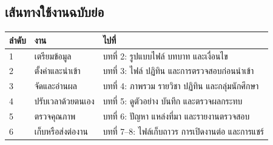 \documentclass[12pt,a4paper]{article}
\begin{document}
\subsection*{เส้นทางใช้งานฉบับย่อ}
\begin{center}
\begin{tabular}{L{1.1cm}L{4.2cm}L{8.6cm}}
\toprule
\textbf{ลำดับ} & \textbf{งาน} & \textbf{ไปที่} \\
 & เตรียมข้อมูล & บทที่ 2: รูปแบบไฟล์ บทบาท และเงื่อนไข \\
2 & ตั้งค่าและนำเข้า & บทที่ 3: ไฟล์ ปฏิทิน และการตรวจสอบก่อนนำเข้า \\
3 & จัดและอ่านผล & บทที่ 4: ภาพรวม รายวิชา ปฏิทิน และกลุ่มนักศึกษา \\
4 & ปรับเวลาด้วยตนเอง & บทที่ 5: ดูตัวอย่าง บันทึก และตรวจผลกระทบ \\
5 & ตรวจคุณภาพ & บทที่ 6: ปัญหา แหล่งที่มา และรายงานตรวจสอบ \\
6 & เก็บหรือส่งต่องาน & บทที่ 7--8: ไฟล์เก็บถาวร การเปิดงานต่อ และการแชร์ \\
\bottomrule
\end{tabular}
\end{center}

\clearpage
\tableofcontents
\clearpage














\end{document}
